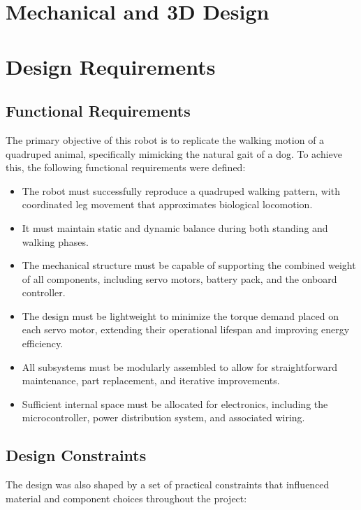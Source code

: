 \documentclass{article}
\begin{document}
\section{Mechanical and 3D Design}

\section{Design Requirements}

\subsection*{Functional Requirements}

The primary objective of this robot is to replicate the walking motion of a quadruped animal, specifically mimicking the natural gait of a dog. To achieve this, the following functional requirements were defined:

\begin{itemize}
    \item The robot must successfully reproduce a quadruped walking pattern, with coordinated leg movement that approximates biological locomotion.
    \item It must maintain static and dynamic balance during both standing and walking phases.
    \item The mechanical structure must be capable of supporting the combined weight of all components, including servo motors, battery pack, and the onboard controller.
    \item The design must be lightweight to minimize the torque demand placed on each servo motor, extending their operational lifespan and improving energy efficiency.
    \item All subsystems must be modularly assembled to allow for straightforward maintenance, part replacement, and iterative improvements.
    \item Sufficient internal space must be allocated for electronics, including the microcontroller, power distribution system, and associated wiring.
\end{itemize}

\subsection*{Design Constraints}

The design was also shaped by a set of practical constraints that influenced material and component choices throughout the project:
\end{document}
